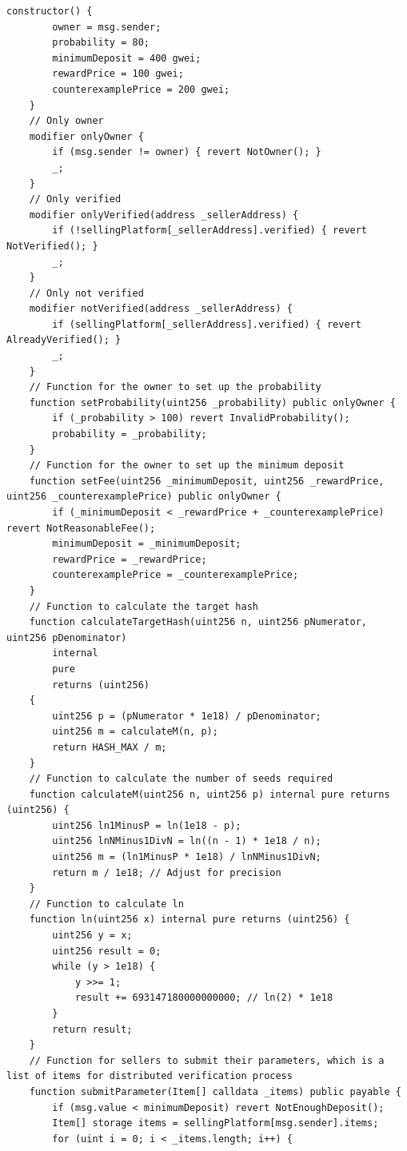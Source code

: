 \documentclass[runningheads]{llncs}
\begin{document}
\begin{lstlisting}[numbers=none]
    constructor() {
        owner = msg.sender;
        probability = 80;
        minimumDeposit = 400 gwei;
        rewardPrice = 100 gwei;
        counterexamplePrice = 200 gwei;
    }
    // Only owner
    modifier onlyOwner {
        if (msg.sender != owner) { revert NotOwner(); }
        _;
    }
    // Only verified
    modifier onlyVerified(address _sellerAddress) {
        if (!sellingPlatform[_sellerAddress].verified) { revert NotVerified(); }
        _;
    }
    // Only not verified
    modifier notVerified(address _sellerAddress) {
        if (sellingPlatform[_sellerAddress].verified) { revert AlreadyVerified(); }
        _;
    }
    // Function for the owner to set up the probability
    function setProbability(uint256 _probability) public onlyOwner {
        if (_probability > 100) revert InvalidProbability(); 
        probability = _probability;
    }
    // Function for the owner to set up the minimum deposit
    function setFee(uint256 _minimumDeposit, uint256 _rewardPrice, uint256 _counterexamplePrice) public onlyOwner {
        if (_minimumDeposit < _rewardPrice + _counterexamplePrice) revert NotReasonableFee();
        minimumDeposit = _minimumDeposit;
        rewardPrice = _rewardPrice;
        counterexamplePrice = _counterexamplePrice;
    }
    // Function to calculate the target hash
    function calculateTargetHash(uint256 n, uint256 pNumerator, uint256 pDenominator)
        internal
        pure
        returns (uint256)
    {
        uint256 p = (pNumerator * 1e18) / pDenominator;
        uint256 m = calculateM(n, p);
        return HASH_MAX / m;
    }
    // Function to calculate the number of seeds required
    function calculateM(uint256 n, uint256 p) internal pure returns (uint256) {
        uint256 ln1MinusP = ln(1e18 - p);
        uint256 lnNMinus1DivN = ln((n - 1) * 1e18 / n);
        uint256 m = (ln1MinusP * 1e18) / lnNMinus1DivN;
        return m / 1e18; // Adjust for precision
    }
    // Function to calculate ln
    function ln(uint256 x) internal pure returns (uint256) {
        uint256 y = x;
        uint256 result = 0;
        while (y > 1e18) {
            y >>= 1;
            result += 693147180000000000; // ln(2) * 1e18
        }
        return result;
    }
    // Function for sellers to submit their parameters, which is a list of items for distributed verification process
    function submitParameter(Item[] calldata _items) public payable {
        if (msg.value < minimumDeposit) revert NotEnoughDeposit();
        Item[] storage items = sellingPlatform[msg.sender].items;
        for (uint i = 0; i < _items.length; i++) {

\end{lstlisting}
\end{document}
